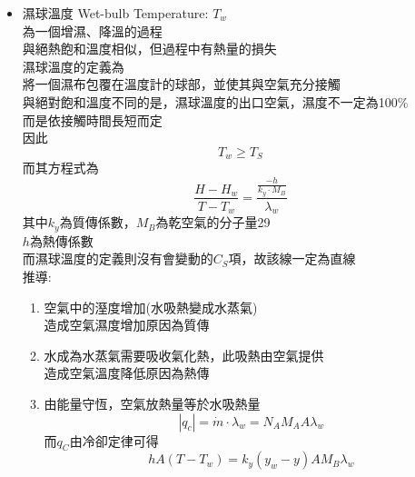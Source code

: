 \documentclass[../main.tex]{subfiles}
\begin{document}
\begin{itemize}
\begin{equation}
  \end{equation}
  故可得上述公式\\
  而從圖中，則是由輸入的乾空氣點，尋內差的紅線找到$100\%$濕度的交點\\
  該點對應的$x$軸溫度即為絕熱飽和溫度$T_S$\\
  $y$軸的濕度即為飽和濕度$H_S$\\
  不過須注意的是，這裡的$C_S$並不是常數，而是$1.005 + 1.88 H$\\
  因此實際上他應該不是直線，而是曲線\\
  但由於濕度變化不大，故可近似為直線
  \item 濕球溫度 Wet-bulb Temperature: $T_{w}$\\
  為一個增濕、降溫的過程\\
  與絕熱飽和溫度相似，但過程中有熱量的損失\\
  濕球溫度的定義為\\
  將一個濕布包覆在溫度計的球部，並使其與空氣充分接觸\\
  與絕對飽和溫度不同的是，濕球溫度的出口空氣，濕度不一定為100\%\\
  而是依接觸時間長短而定\\
  因此
  \begin{equation}
    T_w \geq T_S
  \end{equation}
  而其方程式為
  \begin{equation}
    \frac{H - H_w}{T - T_w} = \frac{\frac{-h}{k_y\cdot M_B}}{\lambda_w}
  \end{equation}
  其中$k_y$為質傳係數，$M_B$為乾空氣的分子量29\\
  $h$為熱傳係數\\
  而濕球溫度的定義則沒有會變動的$C_S$項，故該線一定為直線\\
  推導:
  \begin{enumerate}
    \item 空氣中的溼度增加(水吸熱變成水蒸氣)\\
    造成空氣濕度增加原因為質傳
    \item 水成為水蒸氣需要吸收氣化熱，此吸熱由空氣提供\\
    造成空氣溫度降低原因為熱傳
    \item 由能量守恆，空氣放熱量等於水吸熱量
    \begin{equation}
      |q_c|= \dot m \cdot \lambda_w = N_A M_A A \lambda_w
    \end{equation}
    而$q_C$由冷卻定律可得
    \begin{equation}
      hA(T - T_w) = k_y(y_w - y)AM_B\lambda_w
    \end{equation}

\end{enumerate}
\end{itemize}
\end{document}
